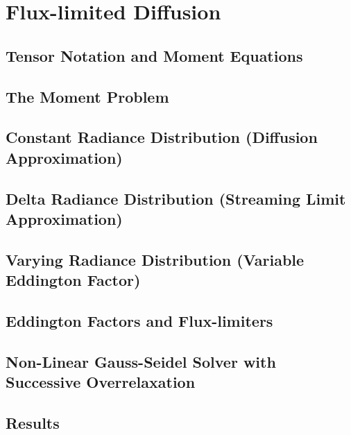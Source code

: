 \chapter{Flux-limited Diffusion}
%
\label{sec:fld}

\section{Tensor Notation and Moment Equations}
\section{The Moment Problem}
\section{Constant Radiance Distribution (Diffusion Approximation)}
\section{Delta Radiance Distribution (Streaming Limit Approximation)}
\section{Varying Radiance Distribution (Variable Eddington Factor)}
\section{Eddington Factors and Flux-limiters}
\section{Non-Linear Gauss-Seidel Solver with Successive Overrelaxation}
\section{Results}
